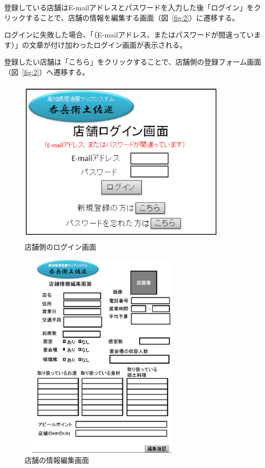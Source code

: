 \documentclass[a4j,titlepage]{jarticle}
\begin{document}
登録している店舗はE-mailアドレスとパスワードを入力した後「ログイン」をクリックすることで、店舗の情報を編集する画面（図~\ref{fig:2}）に遷移する。



ログインに失敗した場合、「（E-mailアドレス、またはパスワードが間違っています）」の文章が付け加わったログイン画面が表示される。



登録したい店舗は「こちら」をクリックすることで、店舗側の登録フォーム画面（図~\ref{fig:2}）へ遷移する。



\begin {figure}[!htbp]
    \begin{center}
    \includegraphics [height=8cm, width=10cm]{27.eps}
    \caption {店舗側のログイン画面}
    \label {fig:27}
    \end{center}
\end {figure}



\begin {figure}[!htbp]
    \begin{center}
    \includegraphics [height=10cm, width=8cm]{28.eps}
    \caption {店舗の情報編集画面}
    \label {fig:28}
    \end{center}
\end {figure}
\end{document}
